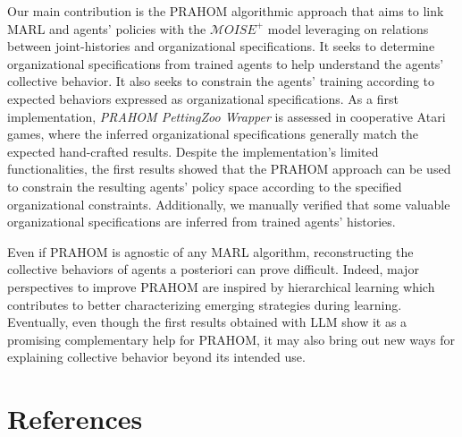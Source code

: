 \documentclass[runningheads]{llncs}
\newcounter{relation}
\begin{document}

Our main contribution is the PRAHOM algorithmic approach that aims to link MARL and agents' policies with the $\mathcal{M}OISE^+$ model leveraging on relations between joint-histories and organizational specifications. It seeks to determine organizational specifications from trained agents to help understand the agents' collective behavior. It also seeks to constrain the agents' training according to expected behaviors expressed as organizational specifications.
As a first implementation, \emph{PRAHOM PettingZoo Wrapper} is assessed in cooperative Atari games, where the inferred organizational specifications generally match the expected hand-crafted results.
Despite the implementation's limited functionalities, the first results showed that the PRAHOM approach can be used to constrain the resulting agents' policy space according to the specified organizational constraints. Additionally, we manually verified that some valuable organizational specifications are inferred from trained agents' histories.

Even if PRAHOM is agnostic of any MARL algorithm, reconstructing the collective behaviors of agents a posteriori can prove difficult. Indeed, major perspectives to improve PRAHOM are inspired by hierarchical learning which contributes to better characterizing emerging strategies during learning.
Eventually, even though the first results obtained with LLM show it as a promising complementary help for PRAHOM, it may also bring out new ways for explaining collective behavior beyond its intended use.


\section*{References}




\end{document}
